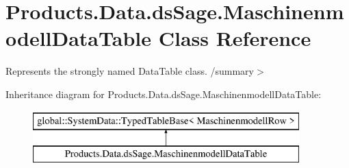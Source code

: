 \hypertarget{class_products_1_1_data_1_1ds_sage_1_1_maschinenmodell_data_table}{}\section{Products.\+Data.\+ds\+Sage.\+Maschinenmodell\+Data\+Table Class Reference}
\label{class_products_1_1_data_1_1ds_sage_1_1_maschinenmodell_data_table}


Represents the strongly named Data\+Table class. /summary$>$  


Inheritance diagram for Products.\+Data.\+ds\+Sage.\+Maschinenmodell\+Data\+Table\+:\begin{figure}[H]
\begin{center}
\leavevmode
\includegraphics[height=2.000000cm]{class_products_1_1_data_1_1ds_sage_1_1_maschinenmodell_data_table}
\end{center}
\end{figure}
